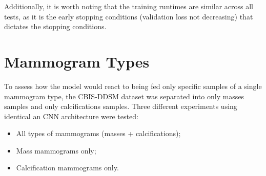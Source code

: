 Additionally, it is worth noting that the training runtimes are similar across all tests, as it is the early stopping conditions (validation loss not decreasing) that dictates the stopping conditions.






\section{Mammogram Types}

To assess how the model would react to being fed only specific samples of a single mammogram type, the CBIS-DDSM dataset was separated into only masses samples and only calcifications samples. Three different experiments using identical an CNN architecture were tested:
\begin{itemize}
    \item All types of mammograms (masses + calcifications);
    \item Mass mammograms only;
    \item Calcification mammograms only.
\end{itemize}


